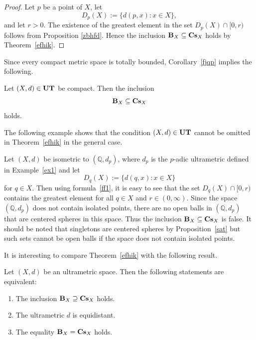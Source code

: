 \documentclass{article}
\begin{document}
\begin{proof}
Let $p$ be a point of $X$, let
\[
D_p(X):=\{d(p,x): x\in X\},
\]
and let $r>0$.
The existence of the greatest element in the set $D_p(X)\cap [0,r)$ follows from Proposition \ref{zbhfd}.
Hence the inclusion
\(
{\bf B}_X \subseteq {\bf Cs}_X
\)
holds by Theorem~\ref{efhik}. 
\end{proof}


Since every compact metric space is totally bounded, Corollary~\ref{fjqp} implies the following.


\begin{Corollary}
Let $(X,d)\in {\bf UT}$ be compact. Then the inclusion
\begin{equation*}
{\bf B}_X \subseteq {\bf Cs}_X
\end{equation*}
holds. 
\end{Corollary}


The following example shows that the condition $(X,d)\in {\bf UT}$ cannot be omitted in Theorem~\ref{efhik} in the general case.




\begin{Example}
\label{nbv}
    Let $(X,d)$ be isometric to $({\mathbb Q}, d_p)$, where $d_p$ is the $p$-adic ultrametric defined in Example~\ref{ex1}  and let 
    \begin{equation*}
        D_q(X):=\{d(q,x)\colon x\in X\}
    \end{equation*}
    for $q\in X$.
    Then using formula~\eqref{ff1}, it is easy to see that the set $D_q(X)\cap[0,r)$ contains the greatest element for all $q\in X$ and $r\in (0,\infty)$. Since the space $({\mathbb Q}, d_p)$ does not contain isolated points, there are no open balls in $({\mathbb Q}, d_p)$ that are centered spheres in this space. Thus the inclusion ${\bf B}_{X}\subseteq {\bf Cs}_{X}$ is false. It should be noted that singletons are centered spheres by Proposition~\ref{sat} but such sets cannot be open balls if the space does not contain isolated points.
\end{Example}


It is interesting to compare Theorem~\ref{efhik} with the following result.







\begin{Theorem}\label{kmhg}
Let $(X,d)$ be an ultrametric space. Then the following statements are equivalent:

\begin{enumerate}[label=\textit{(\roman*)}, left=0pt]
\item The inclusion ${\bf B}_{X} \supseteq {\bf Cs}_{X}$ holds.
\item The ultrametric $d$ is equidistant.
\item The equality ${\bf B}_{X} = {\bf Cs}_{X}$ holds.
\end{enumerate}
\end{Theorem}
\end{document}
